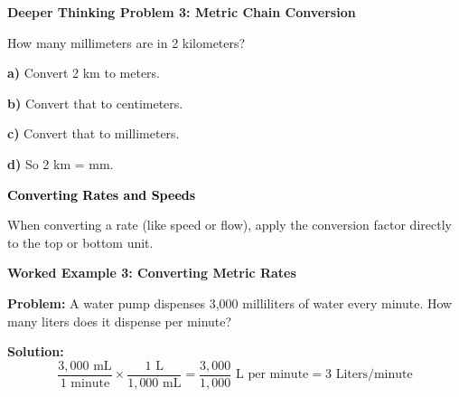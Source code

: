 \documentclass[12pt, letterpaper, fleqn]{article}
\newcommand{\blank}{\underline{\hspace{2.2cm}}}
\begin{document}
\vspace{4mm}

\begin{tcolorbox}[colback=white!15, colframe=black, boxrule=1.5pt, arc=4mm, left=6mm, right=6mm, top=5mm, bottom=5mm]

\textbf{Deeper Thinking Problem 3: Metric Chain Conversion}
\vspace{0.7cm}

\noindent
How many millimeters are in 2 kilometers?
\vspace{1cm}

\noindent
\textbf{a)} Convert 2 km to meters.

\vspace{1.3cm}

\noindent
\textbf{b)} Convert that to centimeters.

\vspace{1.3cm}

\noindent
\textbf{c)} Convert that to millimeters.

\vspace{1.3cm}

\noindent
\textbf{d)} So 2 km = \blank mm.
\vspace{1.3cm}
\end{tcolorbox}
\vspace{0.5cm}

\begin{tcolorbox}[colback=customteal!20]
\large\textcolor{black}{\textbf{Converting Rates and Speeds}}
\end{tcolorbox}

\noindent
When converting a rate (like speed or flow), apply the conversion factor directly to the top or bottom unit.

\vspace{3mm}

\begin{tcolorbox}[colback=white, colframe=black!25, boxrule=0.6pt, arc=4mm, left=6mm, right=6mm, top=5mm, bottom=5mm]

\textbf{Worked Example 3: Converting Metric Rates}

\medskip

\textbf{Problem:} A water pump dispenses 3,000 milliliters of water every minute. How many liters does it dispense per minute?

\medskip

\noindent
\textbf{Solution:}
$$\dfrac{3,000 \text{ mL}}{1 \text{ minute}} \times \dfrac{1 \text{ L}}{1,000 \text{ mL}} = \dfrac{3,000}{1,000} \text{ L per minute} = 3 \text{ Liters/minute}$$



\end{tcolorbox}
\end{document}
